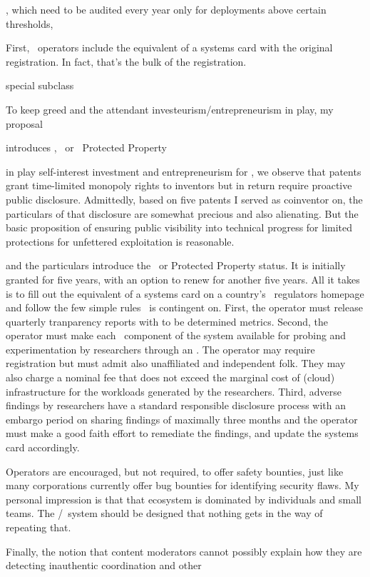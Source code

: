 , which need to be audited every year only for
deployments above certain thresholds,


First, \AIPP\ operators include the equivalent
of a systems card with the original registration. In fact, that's the bulk
of the registration.


special subclass

To keep greed and the attendant investeurism/entrepreneurism in play, my proposal


introduces  \AIP, \AIPP\ or \AI\ Protected Property


in play self-interest investment and entrepreneurism for \AI, we observe that
patents grant time-limited monopoly rights to inventors but in return require
proactive public disclosure. Admittedly, based on five patents I served as
coinventor on, the particulars of that disclosure are somewhat precious and also
alienating. But the basic proposition of ensuring public visibility into
technical progress for limited protections for unfettered exploitation is
reasonable.


and the particulars introduce the \AIPP\ or \AI Protected Property
status. It is initially granted for five years, with an option to renew for
another five years. All it takes is to fill out the equivalent of a systems card
on a country's \AI\ regulators homepage and follow the few simple rules \AIPP\
is contingent on. First, the operator must release quarterly tranparency reports
with to be determined metrics. Second, the operator must make each \AI\
component of the system available for probing and experimentation by researchers
through an \API. The operator may require registration but must admit also
unaffiliated and independent folk. They may also charge a nominal fee that does
not exceed the marginal cost of (cloud) infrastructure for the workloads
generated by the researchers. Third, adverse findings by researchers have a
standard responsible disclosure process with an embargo period on sharing
findings of maximally three months and the operator must make a good faith
effort to remediate the findings, and update the systems card accordingly.


Operators are encouraged, but not required, to offer safety bounties, just like
many corporations currently offer bug bounties for identifying security flaws.
My personal impression is that that ecosystem is dominated by individuals and
small teams. The \AIP/\AIPP\ system should be designed that nothing gets in the
way of repeating that.

Finally, the notion that content moderators cannot possibly explain how they
are detecting inauthentic coordination and other


